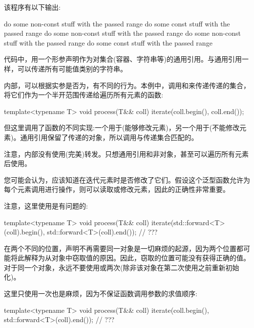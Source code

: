 该程序有以下输出:

\begin{outputcode}
do some non-const stuff with the passed range
do some const stuff with the passed range
do some non-const stuff with the passed range
do some non-const stuff with the passed range
do some const stuff with the passed range
\end{outputcode}

代码中，用一个形参声明作为对集合(容器、字符串等)的通用引用。与通用引用一样，可以传递所有可能值类别的字符串。

内部，可以根据实参是否为，有不同的行为。本例中，调用和来传递传递的集合，将它们作为一个半开范围传递给遍历所有元素的函数:

\begin{cppcode}
template<typename T>
void process(T&& coll)
{
	iterate(coll.begin(), coll.end());
}
\end{cppcode}

但这里调用了函数的不同实现:一个用于(能够修改元素)，另一个用于(不能修改元素)。通用引用保留了传递的对象，所以调用与传递集合匹配的。

注意，内部没有使用(完美)转发。只想通用引用和非对象，甚至可以遍历所有元素后使用。

您可能会认为，应该知道在迭代元素时是否修改了它们。假设这个泛型函数允许为每个元素调用进行操作，则可以读取或修改元素，因此的正确性非常重要。

注意，这里使用是有问题的:

\begin{cppcode}
template<typename T>
void process(T&& coll)
{
	iterate(std::forward<T>(coll).begin(), std::forward<T>(coll).end()); // ???
}
\end{cppcode}

在两个不同的位置，声明不再需要同一对象是一切麻烦的起源，因为两个位置都可能将此解释为从对象中窃取值的原因。因此，窃取的位置可能没有获得正确的值。对于同一个对象，永远不要使用或两次(除非该对象在第二次使用之前重新初始化)。

这里只使用一次也是麻烦，因为不保证函数调用参数的求值顺序:

\begin{cppcode}
template<typename T>
void process(T&& coll)
{
	iterate(coll.begin(), std::forward<T>(coll).end()); // ???
}
\end{cppcode}

